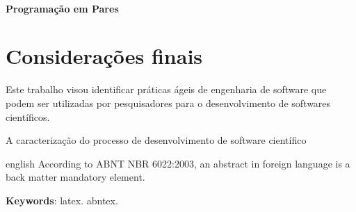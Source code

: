 \documentclass[
	article,			%
	11pt,				%
	oneside,			%
	a4paper,			%
	english,			%
	brazil,				%
	sumario=tradicional
	]{abntex2}
\begin{document}
\paragraph*{Programação em Pares}

% 

\section*{Considerações finais}
Este trabalho visou identificar práticas ágeis de engenharia de software que podem ser utilizadas por pesquisadores para o desenvolvimento de softwares científicos.

A caracterização do processo de desenvolvimento de software científico 

\postextual



\emptythanks
\maketitle

\renewcommand{\resumoname}{Abstract}
\begin{resumoumacoluna}
 \begin{otherlanguage*}{english}
   According to ABNT NBR 6022:2003, an abstract in foreign language is a back
   matter mandatory element.

   \vspace{\onelineskip}
 
   \noindent
   \textbf{Keywords}: latex. abntex.
 \end{otherlanguage*}  
\end{resumoumacoluna}



\end{document}
